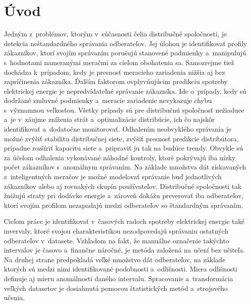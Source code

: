\documentclass[a4paper,twoside,slovak,12pt,appendix]{article}
\begin{document}

\newpage
{}
\tableofcontents

\newpage
\listoffigures

\newpage
\listoftables


\newpage\null\thispagestyle{empty}
\newpage
{}
\setcounter{page}{1}
\section{Úvod}
Jedným z~problémov, ktorým v~súčasnosti čelia distribučné spoločnosti, je
detekcia neštandardného správania odberateľov. Jej úlohou je identifikovať
profily zákazníkov, ktorí svojím správaním porušujú stanovené podmienky
a~manipulujú s~hodnotami nameranými meračmi za cieľom obohatenia sa. Samozrejme
tiež dochádza k~prípadom, kedy je presnosť meracieho zariadenia nižšia aj bez
zapríčinenia zákazníka. Ďalším faktorom ovplyvňujúcim predikciu spotreby
elektrickej energie je nepredvídateľné správanie zákazníka. Ide o~prípady, kedy
sú dodržané zmluvné podmienky a~meracie zariadenie nevykazuje chybu s~významnou
veľkosťou. Všetky prípady sú pre distribučnú spoločnosť nežiaduce a~je v~záujme
zníženia strát a~optimalizácie distribúcie, ich čo najskôr identifikovať
a~dodatočne monitorovať. Odhalením neobvyklého správania je možné zvýšiť
stabilitu distribučnej siete, zvýšiť presnosť predikcie distribútora, prípadne
rozšíriť kapacitu siete a~pripraviť ju tak na budúce trendy. Obvykle sú za
účelom odhalenia vykonávané náhodné kontroly, ktoré pokrývajú iba nízky počet
zákazníkov s~anomálnym správaním. Na základe množstva dát získavaných
z~inteligentných meračov je možné modelovať správanie buď jednotlivých
zákazníkov alebo aj rovnakých skupín používateľov. Distribučné spoločnosti tak
žnižujú straty pri dodávke energie a~zároveň dokážu preverovať iba odberateľov,
ktorí svojím profilom nezapadajú medzi odberateľov so štandardným správaním.

Cieľom práce je identifikovať v~časových radoch spotreby elektrickej energie
také invervaly, ktoré svojou charakteristikou nezodpovedajú správaniu ostatných
odberateľov v~datasete. Vzhľadom na fakt, že manuálne označenie takýchto
intervalov je časovo a~finančne náročné, je metóda založená na učení bez
učiteľa. Na druhej strane predpokladá veľké množstvo dát odberateľov, na základe
ktorých sú medzi nimi identifikované podobnosti a~odlišnosti. Miera odlišnosti
definuje aj mieru anomálnosti daného intervalu. Spracovanie a~transformácia
veľkých datasetov je dosiahnutá pomocou štatistických metód a~strojového učenia.
\end{document}
